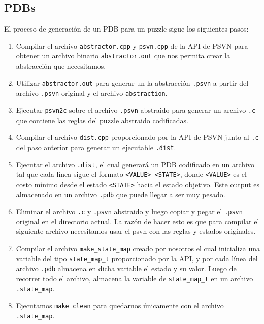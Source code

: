 \documentclass[a4paper,10pt]{article}
\begin{document}
  \subsection{PDBs}
    El proceso de generaci\'on de un PDB para un puzzle sigue los siguientes pasos:
    \begin{enumerate}
      \item Compilar el archivo \verb|abstractor.cpp| y \verb|psvn.cpp| de la API de 
      PSVN para obtener un archivo binario \verb|abstractor.out| que nos permita crear 
      la abstracci\'on que necesitamos.
      \item Utilizar \verb|abstractor.out| para generar un la abstracci\'on \verb|.psvn| 
      a partir del archivo \verb|.psvn| original y el archivo \verb|abstraction|.
      \item Ejecutar \verb|psvn2c| sobre el archivo \verb|.psvn| abstraido para generar 
      un archivo \verb|.c| que contiene las reglas del puzzle abstraido codificadas.
      \item Compilar el archivo \verb|dist.cpp| proporcionado por la API de PSVN junto 
      al \verb|.c| del paso anterior para generar un ejecutable \verb|.dist|.
      \item Ejecutar el archivo \verb|.dist|, el cual generar\'a un PDB codificado en 
      un archivo tal que cada l\'inea sigue el formato \verb|<VALUE> <STATE>|, donde 
      \verb|<VALUE>| es el costo m\'inimo desde el estado \verb|<STATE>| hacia el estado 
      objetivo. Este output es almacenado en un archivo \verb|.pdb| que puede llegar a 
      ser muy pesado.
      \item Eliminar el archivo \verb|.c| y \verb|.psvn| abstraido y luego copiar y 
      pegar el \verb|.psvn| original en el directorio actual. La raz\'on de hacer esto 
      es que para compilar el siguiente archivo necesitamos usar el psvn con las reglas 
      y estados originales.
      \item Compilar el archivo \verb|make_state_map| creado por nosotros el cual 
      inicializa una variable del tipo \verb|state_map_t| proporcionado por la API, y 
      por cada l\'inea del archivo \verb|.pdb| almacena en dicha variable el estado y 
      su valor. Luego de recorrer todo el archivo, almacena la variable de 
      \verb|state_map_t| en un archivo \verb|.state_map|.
      \item Ejecutamos \verb|make clean| para quedarnos \'unicamente con el archivo 
      \verb|.state_map|.
    \end{enumerate}
\end{document}
